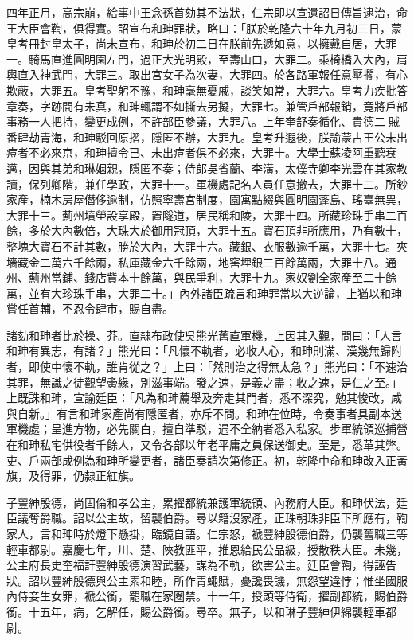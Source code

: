\begin{pinyinscope}
四年正月，高宗崩，給事中王念孫首劾其不法狀，仁宗即以宣遺詔日傳旨逮治，命王大臣會鞫，俱得實。詔宣布和珅罪狀，略曰：「朕於乾隆六十年九月初三日，蒙皇考冊封皇太子，尚未宣布，和珅於初二日在朕前先遞如意，以擁戴自居，大罪一。騎馬直進圓明園左門，過正大光明殿，至壽山口，大罪二。乘椅橋入大內，肩輿直入神武門，大罪三。取出宮女子為次妻，大罪四。於各路軍報任意壓擱，有心欺蔽，大罪五。皇考聖躬不豫，和珅毫無憂戚，談笑如常，大罪六。皇考力疾批答章奏，字跡間有未真，和珅輒謂不如撕去另擬，大罪七。兼管戶部報銷，竟將戶部事務一人把持，變更成例，不許部臣參議，大罪八。上年奎舒奏循化、貴德二賊番肆劫青海，和珅駁回原摺，隱匿不辦，大罪九。皇考升遐後，朕諭蒙古王公未出痘者不必來京，和珅擅令已、未出痘者俱不必來，大罪十。大學士蘇凌阿重聽衰邁，因與其弟和琳姻親，隱匿不奏；侍郎吳省蘭、李潢，太僕寺卿李光雲在其家教讀，保列卿階，兼任學政，大罪十一。軍機處記名人員任意撤去，大罪十二。所鈔家產，楠木房屋僭侈逾制，仿照寧壽宮制度，園寓點綴與圓明園蓬島、瑤臺無異，大罪十三。薊州墳塋設享殿，置隧道，居民稱和陵，大罪十四。所藏珍珠手串二百餘，多於大內數倍，大珠大於御用冠頂，大罪十五。寶石頂非所應用，乃有數十，整塊大寶石不計其數，勝於大內，大罪十六。藏銀、衣服數逾千萬，大罪十七。夾墻藏金二萬六千餘兩，私庫藏金六千餘兩，地窖埋銀三百餘萬兩，大罪十八。通州、薊州當鋪、錢店貲本十餘萬，與民爭利，大罪十九。家奴劉全家產至二十餘萬，並有大珍珠手串，大罪二十。」內外諸臣疏言和珅罪當以大逆論，上猶以和珅嘗任首輔，不忍令肆市，賜自盡。

諸劾和珅者比於操、莽。直隸布政使吳熊光舊直軍機，上因其入覲，問曰：「人言和珅有異志，有諸？」熊光曰：「凡懷不軌者，必收人心，和珅則滿、漢幾無歸附者，即使中懷不軌，誰肯從之？」上曰：「然則治之得無太急？」熊光曰：「不速治其罪，無識之徒觀望夤緣，別滋事端。發之速，是義之盡；收之速，是仁之至。」上既誅和珅，宣諭廷臣：「凡為和珅薦舉及奔走其門者，悉不深究，勉其悛改，咸與自新。」有言和珅家產尚有隱匿者，亦斥不問。和珅在位時，令奏事者具副本送軍機處；呈進方物，必先關白，擅自準駁，遇不全納者悉入私家。步軍統領巡捕營在和珅私宅供役者千餘人，又令各部以年老平庸之員保送御史。至是，悉革其弊。吏、戶兩部成例為和珅所變更者，諸臣奏請次第修正。初，乾隆中命和珅改入正黃旗，及得罪，仍隸正紅旗。

子豐紳殷德，尚固倫和孝公主，累擢都統兼護軍統領、內務府大臣。和珅伏法，廷臣議奪爵職。詔以公主故，留襲伯爵。尋以籍沒家產，正珠朝珠非臣下所應有，鞫家人，言和珅時於燈下懸掛，臨鏡自語。仁宗怒，褫豐紳殷德伯爵，仍襲舊職三等輕車都尉。嘉慶七年，川、楚、陜教匪平，推恩給民公品級，授散秩大臣。未幾，公主府長史奎福訐豐紳殷德演習武藝，謀為不軌，欲害公主。廷臣會鞫，得誣告狀。詔以豐紳殷德與公主素和睦，所作青蠅賦，憂讒畏譏，無怨望違悖；惟坐國服內侍妾生女罪，褫公銜，罷職在家圈禁。十一年，授頭等侍衛，擢副都統，賜伯爵銜。十五年，病，乞解任，賜公爵銜。尋卒。無子，以和琳子豐紳伊綿襲輕車都尉。


\end{pinyinscope}
